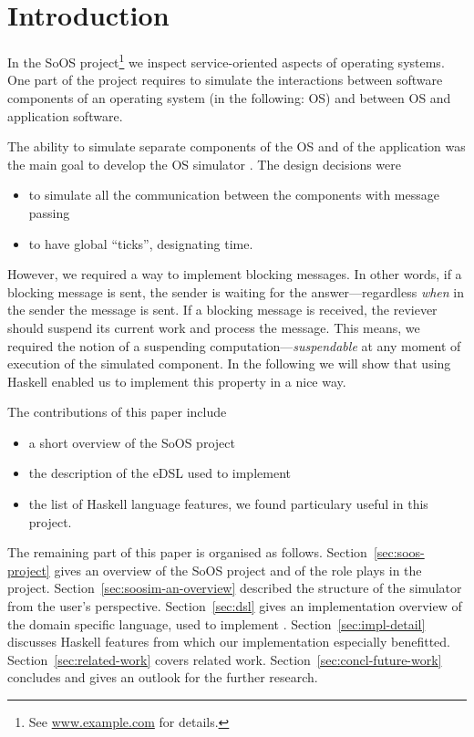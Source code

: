 \section{Introduction}


In the SoOS project\footnote{See \url{www.example.com} for details.} we
inspect service-oriented aspects of operating systems. One part of the
project requires to simulate the interactions between software
components of an operating system (in the following: OS) and between
OS and application software.

The ability to simulate separate components of the OS and of the
application was the main goal to develop the OS simulator \soosim
{}. 
 The design decisions were
\begin{itemize}
\item to simulate all the communication between the components with
  message passing
\item to have global ``ticks'', designating time.
\end{itemize}
However, we required a way to implement blocking messages. In other
words, if a blocking message is sent, the sender is waiting for the
answer---regardless \emph{when} in the sender the message is sent. If
a blocking message is received, the reviever should suspend its
current work and process the message. This
means, we required the notion of a suspending
computation---\emph{suspendable} at any moment of execution of the
simulated component. In the following we will show that using Haskell 
enabled us to implement this property in a nice way.

The contributions of this paper include
\begin{itemize}
\item a short overview of the SoOS project
\item the description of the eDSL used to implement \soosim 
\item the list of Haskell language features, we found particulary
  useful in this project.
\end{itemize}

The remaining part of this paper is organised as
follows. Section~\ref{sec:soos-project} gives an overview of the SoOS
project and of the role \soosim plays in the
project. Section~\ref{sec:soosim-an-overview} described the structure
of the \soosim simulator from the user's
perspective. Section~\ref{sec:dsl} gives an implementation overview of
the domain specific language, used to implement
\soosim. Section~\ref{sec:impl-detail} discusses Haskell features from
which our implementation especially
benefitted. Section~\ref{sec:related-work} covers related
work. Section~\ref{sec:concl-future-work} concludes and gives an
outlook for the further research.

